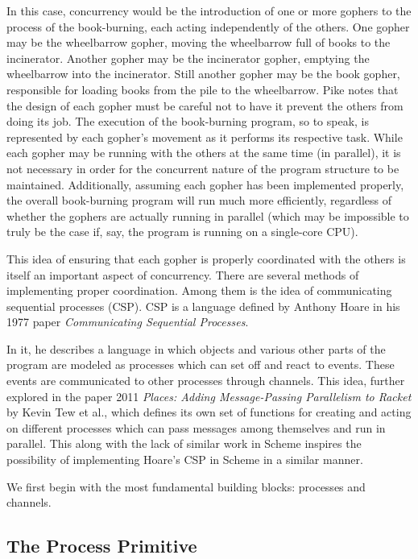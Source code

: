 \documentclass{article}
\begin{document}
In this case, concurrency would be the introduction of one or more gophers
to the process of the book-burning, each acting independently of the
others. One gopher may be the wheelbarrow gopher, moving the wheelbarrow
full of books to the incinerator. Another gopher may be the incinerator
gopher, emptying the wheelbarrow into the incinerator. Still another
gopher may be the book gopher, responsible for loading books from the 
pile to the wheelbarrow. Pike notes that the design of each gopher must be
careful not to have it prevent the others from doing its job. The execution
of the book-burning program, so to speak, is represented by each gopher's
movement as it performs its respective task. While each gopher may be 
running with the others at the same time (in parallel), it is not necessary
in order for the concurrent nature of the program structure to be
maintained. Additionally, assuming each gopher has been implemented 
properly, the overall book-burning program will run much more efficiently,
regardless of whether the gophers are actually running in parallel (which
may be impossible to truly be the case if, say, the program is running
on a single-core CPU).

This idea of ensuring that each gopher is properly coordinated with the
others is itself an important aspect of concurrency. There are several
methods of implementing proper coordination. Among them is the idea of
communicating sequential processes (CSP). CSP is a language defined by 
Anthony Hoare in his 1977 paper \textit{Communicating Sequential Processes}.

In it, he describes a language in which objects and various other parts of
the program are modeled as processes which can set off and react to events.
These events are communicated to other processes through channels. This
idea, further explored in the paper 2011 \textit{Places: Adding Message-Passing Parallelism to Racket} by Kevin Tew et al., which
defines its own set of functions for creating and acting on different
processes which can pass messages among themselves and run in parallel.
This along with the lack of similar work in Scheme inspires the possibility
of implementing Hoare's CSP in Scheme in a similar manner.

We first begin with the most fundamental building blocks: processes and 
channels.

\subsection*{The Process Primitive}
\end{document}
